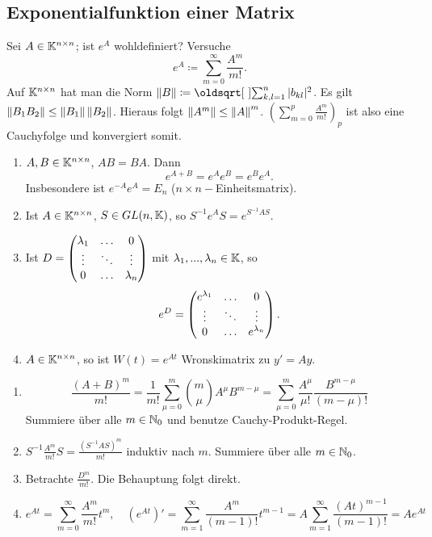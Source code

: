 \subsection{Exponentialfunktion einer Matrix}
Sei $ A\in\mathbb{K}^{n\times n} $; ist $ e^A $ wohldefiniert? Versuche
\[ e^A\coloneqq\sum_{m=0}^{\infty}\frac{A^m}{m!}. \]
Auf $ \mathbb{K}^{n\times n} $ hat man die Norm $ \norm{B}\coloneqq\sqrt{\sum_{k,l=1}^{n}|b_{kl}|^2} $. Es gilt $ \left\|B_1B_2\right\|\leq\left\|B_1\right\|\left\|B_2\right\| $. Hieraus folgt $ \left\|A^m\right\|\leq\left\|A\right\|^m $. $ \left(\sum_{m=0}^{p}\frac{A^m}{m!}\right)_p $ ist also eine Cauchyfolge und konvergiert somit.
\begin{lemma}
	\bullshit
	\begin{enumerate}
		\item $ A,B\in\mathbb{K}^{n\times n} $, $ AB=BA $. Dann
		\[ e^{A+B}=e^Ae^B=e^Be^A. \]
		Insbesondere ist $ e^{-A}e^A=E_n $ ($ n\times n- $Einheitsmatrix).
		\item Ist $ A\in\mathbb{K}^{n\times n} $, $ S\in  GL(n,\mathbb{K}) $, so $ S^{-1}e^A S=e^{S^{-1}AS} $.
		\item Ist $ D=\begin{pmatrix}
		\lambda_1&\hdotsfor{1}&0\\\vdots&\ddots&\vdots\\
		0&\hdotsfor{1}&\lambda_n
		\end{pmatrix} $ mit $ \lambda_1,...,\lambda_n\in\mathbb{K} $, so
		\[ e^D=\begin{pmatrix}
		e^{\lambda_1}&\hdotsfor{1}&0\\\vdots&\ddots&\vdots\\0&\hdotsfor{1}&e^{\lambda_n}
		\end{pmatrix}. \]
		\item $ A\in\mathbb{K}^{n\times n} $, so ist $ W(t)=e^{At} $ Wronskimatrix zu $ y'=Ay $.
	\end{enumerate}
\end{lemma}
\begin{beweis}
	\begin{enumerate}
		\item \[ \frac{(A+B)^m}{m!}=\frac{1}{m!}\sum_{\mu=0}^{m}\binom{m}{\mu}A^\mu B^{m-\mu}=\sum_{\mu=0}^{m}\frac{A^\mu}{\mu!}\frac{B^{m-\mu}}{(m-\mu)!} \]
		Summiere \"uber alle $ m\in\mathbb{N}_0 $ und benutze Cauchy-Produkt-Regel.
		\item $ S^{-1}\frac{A^m}{m!}S=\frac{(S^{-1}AS)^m}{m!} $
		induktiv nach $ m $. Summiere \"uber alle $ m\in\mathbb{N}_0 $.
		\item Betrachte $ \frac{D^m}{m!} $. Die Behauptung folgt direkt.
		\item \[ e^{At}=\sum_{m=0}^{\infty}\frac{A^m}{m!}t^m,\quad \left(e^{At}\right)'=\sum_{m=1}^{\infty}\frac{A^m}{(m-1)!}t^{m-1}=A\sum_{m=1}^{\infty}\frac{(At)^{m-1}}{(m-1)!}=Ae^{At} \]
	\end{enumerate}
\end{beweis}
